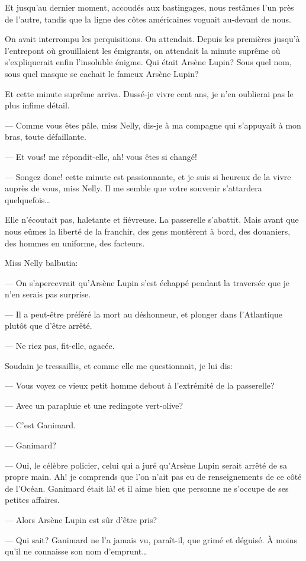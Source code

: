 \documentclass[12pt,a4paper]{book}
\begin{document}
Et jusqu’au dernier moment, accoudés aux bastingages, nous restâmes l’un près de l’autre, tandis que la ligne des côtes américaines voguait au-devant de nous.

On avait interrompu les perquisitions. On attendait. Depuis les premières jusqu’à l’entrepont où grouillaient les émigrants, on attendait la minute suprême où s’expliquerait enfin l’insoluble énigme. Qui était Arsène Lupin? Sous quel nom, sous quel masque se cachait le fameux Arsène Lupin?

Et cette minute suprême arriva. Dussé-je vivre cent ans, je n’en oublierai pas le plus infime détail.

— Comme vous êtes pâle, miss Nelly, dis-je à ma compagne qui s’appuyait à mon bras, toute défaillante.

— Et vous! me répondit-elle, ah! vous êtes si changé!

— Songez donc! cette minute est passionnante, et je suis si heureux de la vivre auprès de vous, miss Nelly. Il me semble que votre souvenir s’attardera quelquefois…

Elle n’écoutait pas, haletante et fiévreuse. La passerelle s’abattit. Mais avant que nous eûmes la liberté de la franchir, des gens montèrent à bord, des douaniers, des hommes en uniforme, des facteurs. 

Miss Nelly balbutia:

— On s’apercevrait qu’Arsène Lupin s’est échappé pendant la traversée que je n’en serais pas surprise.

— Il a peut-être préféré la mort au déshonneur, et plonger dans l’Atlantique plutôt que d’être arrêté.

— Ne riez pas, fit-elle, agacée.

Soudain je tressaillis, et comme elle me questionnait, je lui dis:

— Vous voyez ce vieux petit homme debout à l’extrémité de la passerelle?

— Avec un parapluie et une redingote vert-olive?

— C’est Ganimard.

— Ganimard?

— Oui, le célèbre policier, celui qui a juré qu’Arsène Lupin serait arrêté de sa propre main. Ah! je comprends que l’on n’ait pas eu de renseignements de ce côté de l’Océan. Ganimard était là! et il aime bien que personne ne s’occupe de ses petites affaires.

— Alors Arsène Lupin est sûr d’être pris?

— Qui sait? Ganimard ne l’a jamais vu, paraît-il, que grimé et déguisé. À moins qu’il ne connaisse son nom d’emprunt…
\end{document}
